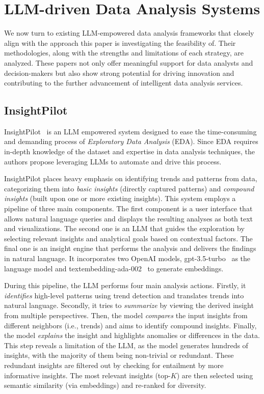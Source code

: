 \documentclass{DESSThesis}
\begin{document}
\section{LLM-driven Data Analysis Systems}

We now turn to existing LLM-empowered data analysis frameworks that closely align with the approach this paper is investigating the feasibility of. Their methodologies, along with the strengths and limitations of each strategy, are analyzed. These papers not only offer meaningful support for data analysts and decision-makers but also show strong potential for driving innovation and contributing to the further advancement of intelligent data analysis services.

\subsection{InsightPilot}

InsightPilot~\cite{ma2023demonstrationinsightpilotllmempoweredautomated} is an LLM empowered system designed to ease the time-consuming and demanding process of \emph{Exploratory Data Analysis} (EDA). Since EDA requires in-depth knowledge of the dataset and expertise in data analysis techniques, the authors propose leveraging LLMs to automate and drive this process.

InsightPilot places heavy emphasis on identifying trends and patterns from data, categorizing them into \emph{basic insights} (directly captured patterns) and \emph{compound insights} (built upon one or more existing insights). This system employs a pipeline of three main components. The first component is a user interface that allows natural language queries and displays the resulting analyses as both text and visualizations. The second one is an LLM that guides the exploration by selecting relevant insights and analytical goals based on contextual factors. The final one is an insight engine that performs the analysis and delivers the findings in natural language. It incorporates two OpenAI models, gpt-3.5-turbo~\cite{openai_gpt35_turbo} as the language model and textembedding-ada-002~\cite{openai_embedding_ada} to generate embeddings.

During this pipeline, the LLM performs four main analysis actions. Firstly, it \emph{identifies} high-level patterns using trend detection and translates trends into natural language. Secondly, it tries to \emph{summarize} by viewing the derived insight from multiple perspectives. Then, the model \emph{compares} the input insights from different neighbors (i.e., trends) and aims to identify compound insights. Finally, the model \emph{explains} the insight and highlights anomalies or differences in the data. This step reveals a limitation of the LLM, as the model generates hundreds of insights, with the majority of them being non-trivial or redundant. These redundant insights are filtered out by checking for entailment by more informative insights. The most relevant insights (top-$K$) are then selected using semantic similarity (via embeddings) and re-ranked for diversity.
\end{document}
